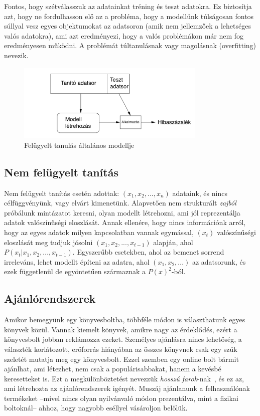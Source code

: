 \documentclass[a4paper,12pt]{article}
\begin{document}
Fontos, hogy szétválasszuk az adatainkat tréning és teszt adatokra. Ez biztosítja azt, hogy ne fordulhasson elő az a probléma, hogy a modellünk túlságosan fontos súllyal vesz egyes objektumokat az adatsoron (amik nem jellemzőek a lehetséges valós adatokra), ami azt eredményezi, hogy a valós problémákon már nem fog eredményesen működni. A problémát túltanulásnak vagy magolásnak (overfitting) nevezik.~\cite{overfit}


\begin{figure}[ht!]
\centering
\includegraphics[width=90mm]{img/ml.png}
\caption{Felügyelt tanulás általános modellje \cite{UlmannSupervised} \label{ml}}
\end{figure}

\subsection{Nem felügyelt tanítás}
Nem felügyelt tanítás esetén adottak: $(x_1, x_2, ..., x_n)$ adataink, és nincs célfüggvényünk, vagy elvárt kimenetünk. Alapvetően nem strukturált \textsl{zajból} próbálunk mintázatot keresni, olyan modellt létrehozni, ami jól reprezentálja adatok valószínűségi eloszlását. Annak ellenére, hogy nincs információnk arról, hogy az egyes adatok milyen kapcsolatban vannak egymással, $(x_t)$ valószínűségi eloszlását meg tudjuk jósolni  $(x_1,x_2, ..., x_{t-1})$ alapján, ahol $P(x_t|x_1,x_2, ..., x_{t-1})$.
Egyszerűbb esetekben, ahol az bemenet sorrend irreleváns, lehet modellt építeni az adatra, ahol $(x_1, x_2, ...)$ az adatsorunk, és ezek függetlenül de egyöntetűen származnak a $P(x)^2$-ból.\cite{unsupervised}

\subsection{Ajánlórendszerek}
Amikor bemegyünk egy könyvesboltba, többféle módon is választhatunk egyes könyvek közül. Vannak kiemelt könyvek, amikre nagy az érdeklődés, ezért a könyvesbolt jobban reklámozza ezeket. Személyes ajánlásra nincs lehetőség, a választék korlátozott, erőforrás hiányában az összes könyvnek csak egy szűk szeletét mutatja meg egy könyvesbolt. Ezzel szemben egy online bolt bármit ajánlhat, ami létezhet, nem csak a populárisabbakat, hanem a kevésbé keresetteket is. Ezt a megkülönböztetést nevezzük \textsl{hosszú farok}-nak~\cite{longtail}, és ez az, ami létrehozta az ajánlórendszerek igényét. Muszáj ajánlanunk a felhasználónak termékeket --mivel nincs olyan nyilvánvaló módon prezentálva, mint a fizikai boltoknál-- ahhoz, hogy nagyobb eséllyel vásároljon belőlük. \newline
\end{document}
